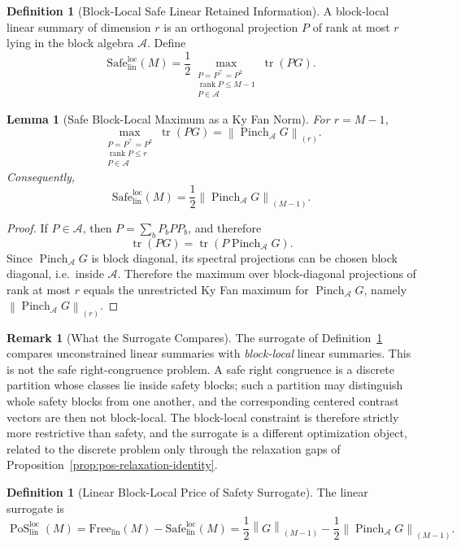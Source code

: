 \documentclass[12pt]{article}
\newtheorem{lemma}[theorem]{Lemma}
\theoremstyle{definition}
\newtheorem{definition}[theorem]{Definition}
\newtheorem{remark}[theorem]{Remark}
\DeclareMathOperator{\rank}{rank}
\DeclareMathOperator{\tr}{tr}
\DeclareMathOperator{\PoS}{PoS}
\newcommand{\EA}{\operatorname{Pinch}_{\mathcal A}}
\newcommand{\KyF}[2]{\left\|#1\right\|_{(#2)}}
\newcommand{\PoSlin}{\PoS_{\mathrm{lin}}^{\mathrm{loc}}}
\begin{document}
\begin{definition}[Block-Local Safe Linear Retained Information]
\label{def:safe-linear-local}
A block-local linear summary of dimension $r$ is an orthogonal projection $P$
of rank at most $r$ lying in the block algebra $\mathcal A$.  Define
\[
\mathrm{Safe}_{\mathrm{lin}}^{\mathrm{loc}}(M)
=
\frac12
\max_{\substack{
P=P^\top=P^2\\
\rank P\le M-1\\
P\in\mathcal A
}}
\tr(PG).
\]
\end{definition}

\begin{lemma}[Safe Block-Local Maximum as a Ky Fan Norm]
\label{lem:safe-local-kyfan}
For $r=M-1$,
\[
\max_{\substack{
P=P^\top=P^2\\
\rank P\le r\\
P\in\mathcal A
}}
\tr(PG)
=
\KyF{\EA G}{r}.
\]
Consequently,
\[
\mathrm{Safe}_{\mathrm{lin}}^{\mathrm{loc}}(M)
=
\frac12
\KyF{\EA G}{M-1}.
\]
\end{lemma}

\begin{proof}
If $P\in\mathcal A$, then $P=\sum_b P_bPP_b$, and therefore
\[
\tr(PG)
=
\tr(P\EA G).
\]
Since $\EA G$ is block diagonal, its spectral projections can be chosen block
diagonal, i.e.\ inside $\mathcal A$.  Therefore the maximum over block-diagonal
projections of rank at most $r$ equals the unrestricted Ky Fan maximum for
$\EA G$, namely $\KyF{\EA G}{r}$.
\end{proof}

\begin{remark}[What the Surrogate Compares]
\label{rem:poslin-measures}
The surrogate of Definition~\ref{def:poslin} compares unconstrained linear
summaries with \emph{block-local} linear summaries.  This is not the safe
right-congruence problem.  A safe right congruence is a discrete partition
whose classes lie inside safety blocks; such a partition may distinguish whole
safety blocks from one another, and the corresponding centered contrast vectors
are then not block-local.  The block-local constraint is therefore strictly
more restrictive than safety, and the surrogate is a different optimization
object, related to the discrete problem only through the relaxation gaps of
Proposition~\ref{prop:pos-relaxation-identity}.
\end{remark}

\begin{definition}[Linear Block-Local Price of Safety Surrogate]
\label{def:poslin}
The linear surrogate is
\[
\PoSlin(M)
=
\mathrm{Free}_{\mathrm{lin}}(M)
-
\mathrm{Safe}_{\mathrm{lin}}^{\mathrm{loc}}(M)
=
\frac12
\KyF{G}{M-1}
-
\frac12
\KyF{\EA G}{M-1}.
\]
\end{definition}
\end{document}
